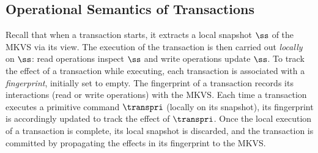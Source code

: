 
\subsection{Operational Semantics of Transactions}
\label{sec:trans-semantics}

Recall that when a transaction starts, it extracts a local snapshot $\ss$ of the MKVS via its view. 
The execution of the transaction is then carried out \emph{locally} on $\ss$:  
read operations inspect $\ss$ and write operations update $\ss$. 
To track the effect of a transaction while executing, each transaction is associated with a \emph{fingerprint}, initially set to empty. 
The fingerprint of a transaction records its interactions (read or write operations) with the MKVS.
Each time a transaction executes a primitive command \( \transpri\) (locally on its snapshot), its fingerprint is accordingly updated to track the effect of $\transpri$.
Once the local execution of a transaction is complete, its local snapshot is discarded, and the transaction is committed by propagating the effects in its fingerprint to the MKVS.
%


